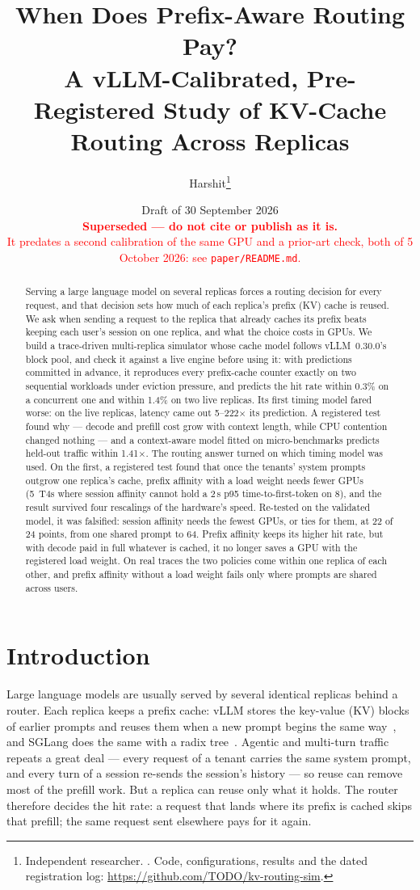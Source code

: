 \documentclass[10pt,twocolumn]{article}
\title{When Does Prefix-Aware Routing Pay?\\[3pt]
\large A vLLM-Calibrated, Pre-Registered Study of KV-Cache Routing Across Replicas}
\author{Harshit\thanks{Independent researcher. \todo{affiliation and e-mail}. Code, configurations,
results and the dated registration log: \url{https://github.com/TODO/kv-routing-sim}.}}
\date{Draft of 30 September 2026\\[4pt]
\textcolor{red}{\textbf{Superseded --- do not cite or publish as it is.}}\\[2pt]
\textcolor{red}{\small It predates a second calibration of the same GPU and a prior-art check,
both of 5 October 2026: see \texttt{paper/README.md}.}}
\begin{document}
\maketitle

\begin{abstract}
Serving a large language model on several replicas forces a routing decision for every request, and
that decision sets how much of each replica's prefix (KV) cache is reused. We ask when sending a
request to the replica that already caches its prefix beats keeping each user's session on one
replica, and what the choice costs in GPUs. We build a trace-driven multi-replica simulator whose
cache model follows vLLM~0.30.0's block pool, and check it against a live engine before using it:
with predictions committed in advance, it reproduces every prefix-cache counter exactly on two
sequential workloads under eviction pressure, and predicts the hit rate within 0.3\% on a concurrent
one and within 1.4\% on two live replicas. Its first timing model fared worse: on the live replicas,
latency came out 5--222$\times$ its prediction. A registered test found why --- decode and prefill
cost grow with context length, while CPU contention changed nothing --- and a context-aware model
fitted on micro-benchmarks predicts held-out traffic within 1.41$\times$. The routing answer turned on
which timing model was used. On the first, a registered test found that once the tenants' system
prompts outgrow one replica's cache, prefix affinity with a load weight needs fewer GPUs (5~T4s where
session affinity cannot hold a 2\,s p95 time-to-first-token on 8), and the result survived four
rescalings of the hardware's speed. Re-tested on the validated model, it was falsified: session
affinity needs the fewest GPUs, or ties for them, at 22 of 24 points, from one shared prompt to 64.
Prefix affinity keeps its higher hit rate, but with decode paid in full whatever is cached, it no
longer saves a GPU with the registered load weight. On real traces the two policies come within one
replica of each other, and prefix affinity without a load weight fails only where prompts are shared
across users.
\end{abstract}

\section{Introduction}

Large language models are usually served by several identical replicas behind a router. Each replica
keeps a prefix cache: vLLM stores the key-value (KV) blocks of earlier prompts and reuses them when a
new prompt begins the same way~\cite{kwon2023}, and SGLang does the same with a radix
tree~\cite{zheng2023}. Agentic and multi-turn traffic repeats a great deal --- every request of a
tenant carries the same system prompt, and every turn of a session re-sends the session's history ---
so reuse can remove most of the prefill work. But a replica can reuse only what it holds. The router
therefore decides the hit rate: a request that lands where its prefix is cached skips that prefill;
the same request sent elsewhere pays for it again.
\end{document}
